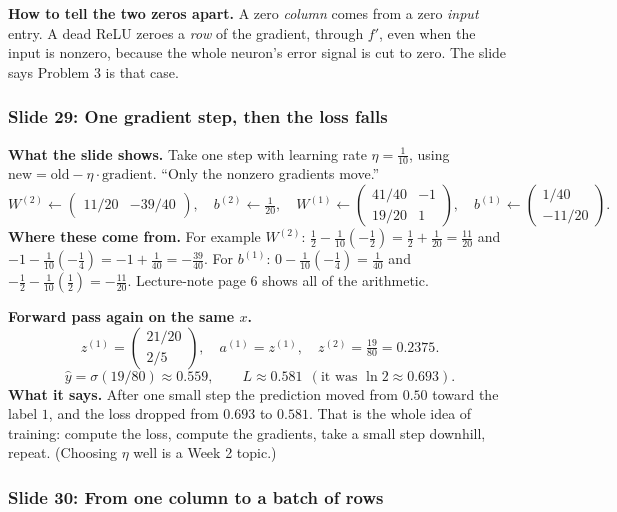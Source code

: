 \textbf{How to tell the two zeros apart.} A zero \emph{column} comes from a zero \emph{input} entry. A dead ReLU zeroes a \emph{row} of the gradient, through $f'$, even when the input is nonzero, because the whole neuron's error signal is cut to zero. The slide says Problem 3 is that case.

\subsubsection{Slide 29: One gradient step, then the loss falls}

\textbf{What the slide shows.} Take one step with learning rate $\eta=\tfrac1{10}$, using $\text{new}=\text{old}-\eta\cdot\text{gradient}$. ``Only the nonzero gradients move.''
\[
W^{(2)}\leftarrow\begin{pmatrix}11/20&-39/40\end{pmatrix},\quad b^{(2)}\leftarrow\tfrac1{20},\quad
W^{(1)}\leftarrow\begin{pmatrix}41/40&-1\\19/20&1\end{pmatrix},\quad b^{(1)}\leftarrow\begin{pmatrix}1/40\\-11/20\end{pmatrix}.
\]
\textbf{Where these come from.} For example $W^{(2)}$: $\tfrac12-\tfrac1{10}(-\tfrac12)=\tfrac12+\tfrac1{20}=\tfrac{11}{20}$ and $-1-\tfrac1{10}(-\tfrac14)=-1+\tfrac1{40}=-\tfrac{39}{40}$. For $b^{(1)}$: $0-\tfrac1{10}(-\tfrac14)=\tfrac1{40}$ and $-\tfrac12-\tfrac1{10}(\tfrac12)=-\tfrac{11}{20}$. Lecture-note page 6 shows all of the arithmetic.

\textbf{Forward pass again on the same $x$.}
\[
z^{(1)}=\begin{pmatrix}21/20\\2/5\end{pmatrix}, \quad a^{(1)}=z^{(1)}, \quad z^{(2)}=\tfrac{19}{80}=0.2375 .
\]
\[
\hat{y}=\sigma(19/80)\approx0.559, \qquad L\approx0.581\ \ (\text{it was }\ln2\approx0.693).
\]
\textbf{What it says.} After one small step the prediction moved from $0.50$ toward the label $1$, and the loss dropped from $0.693$ to $0.581$. That is the whole idea of training: compute the loss, compute the gradients, take a small step downhill, repeat. (Choosing $\eta$ well is a Week 2 topic.)

\subsubsection{Slide 30: From one column to a batch of rows}

